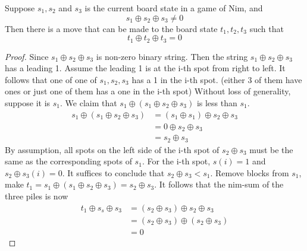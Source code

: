 \begin{lemma}
    Suppose $s_1,s_2$ and $s_3$ is the current board state in a game of Nim, and $$s_1 \oplus s_2 \oplus s_3 \neq 0$$
    Then there is a move that can be made to the board state $t_1,t_2,t_3$ such that $$t_1 \oplus t_2 \oplus t_3=0$$
\end{lemma}
\begin{proof}
    Since $s_1 \oplus s_2 \oplus s_3$ is non-zero binary string. 
    Then the string $s_1 \oplus s_2 \oplus s_3$ has a leading 1. 
    Assume the leading 1 is at the i-th spot from right to left. 
    It follows that one of one of $s_1,s_2,s_3$ has a 1 in the i-th spot. 
    (either 3 of them have ones or just one of them has a one in the i-th spot)
    Without loss of generality, suppose it is $s_1$. We claim that $s_1 \oplus (s_1 \oplus s_2 \oplus s_3)$ is less than $s_1$.
    \begin{equation}
        \begin{split}
            s_1 \oplus (s_1 \oplus s_2 \oplus s_3) &= (s_1 \oplus s_1) \oplus s_2 \oplus s_3\\
            &= 0 \oplus s_2 \oplus s_3\\
            &= s_2 \oplus s_3
        \end{split}
    \end{equation}
    By assumption, all spots on the left side of the i-th spot of $s_2 \oplus s_3$ must be the same as the corresponding spots of $s_1$. 
    For the i-th spot, $s(i)=1$ and $s_2 \oplus s_3(i)=0$. It suffices to conclude that $s_2 \oplus s_3 <s_1$.
    Remove blocks from $s_1$, make $t_1=s_1 \oplus (s_1 \oplus s_2 \oplus s_3)=s_2 \oplus s_3$. 
    It follows that the nim-sum of the three piles is now 
    \begin{equation}
        \begin{split}
            t_1 \oplus s_s \oplus s_3 &= (s_2 \oplus s_3) \oplus s_2 \oplus s_3\\
            &= (s_2 \oplus s_3) \oplus (s_2 \oplus s_3)\\
            &= 0
        \end{split}
    \end{equation}
\end{proof}


